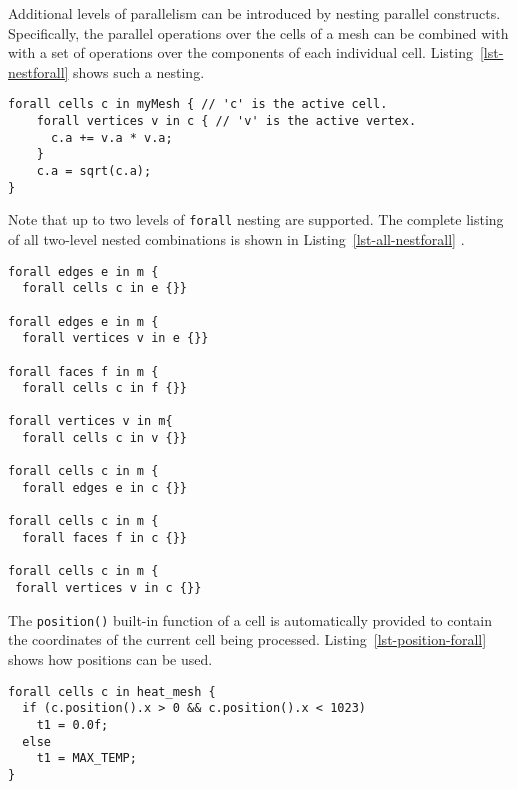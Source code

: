Additional levels of parallelism can be introduced by nesting parallel constructs.  
Specifically, the parallel operations over the cells of a mesh can be combined with  
with a set of operations over the components of each individual cell. Listing~\ref{lst-nestforall} 
shows such a nesting.  

\par\bigskip
\begin{lstlisting}[float=h,label=lst-nestforall,
	caption={Nested \texttt{forall} loop construct over mesh components.}]
forall cells c in myMesh { // 'c' is the active cell.
	forall vertices v in c { // 'v' is the active vertex.
	  c.a += v.a * v.a;
	}
	c.a = sqrt(c.a);
}
\end{lstlisting}
\par\bigskip\noindent

Note that up to two levels of \texttt{forall} nesting are supported.  The complete listing of all two-level nested combinations is shown in Listing~\ref{lst-all-nestforall} .

\par\bigskip
\begin{lstlisting}[float=h,label=lst-all-nestforall,
	caption={All supported two-level nested \texttt{forall} loop constructs over mesh components.}]
forall edges e in m {
  forall cells c in e {}}

forall edges e in m {
  forall vertices v in e {}}

forall faces f in m {
  forall cells c in f {}}

forall vertices v in m{
  forall cells c in v {}}

forall cells c in m {
  forall edges e in c {}}

forall cells c in m {
  forall faces f in c {}}

forall cells c in m {
 forall vertices v in c {}}
\end{lstlisting}
\par\bigskip\noindent


The \texttt{position()} built-in function of a cell is automatically provided to contain the coordinates of the
current cell being processed. Listing~\ref{lst-position-forall} shows how positions can be
used.

\par\bigskip
\begin{lstlisting}[float=h,label=lst-position-forall,
	caption={Accessing the position of cells within \texttt{forall} loop construct.}]
forall cells c in heat_mesh {
  if (c.position().x > 0 && c.position().x < 1023)
    t1 = 0.0f;
  else
    t1 = MAX_TEMP;      
}
\end{lstlisting}
\par\bigskip\noindent

